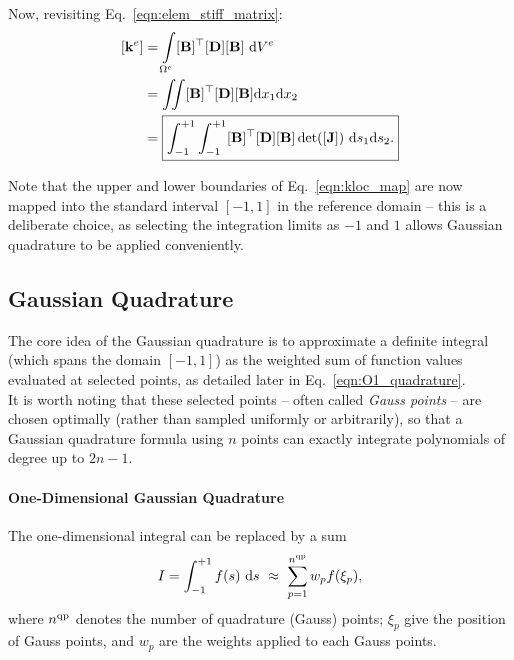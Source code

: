 \documentclass[12pt, a4paper]{article}
\numberwithin{equation}{section}
\begin{document}
Now, revisiting Eq.~\eqref{eqn:elem_stiff_matrix}:
\begin{align}
    [\mathbf{k}^e] 
    & = \int\limits_{\Omega^{e}} [\mathbf{B}]^\top [\mathbf{D}] [\mathbf{B}] \ \mathrm{d} V^e \nonumber \\
    & = \iint [\mathbf{B}]^\top [\mathbf{D}] [\mathbf{B}] \mathrm{d}x_1 \mathrm{d}x_2 \nonumber \\
    & = \boxed{\int_{-1}^{+1} \int_{-1}^{+1} [\mathbf{B}]^\top [\mathbf{D}] [\mathbf{B}] \det([\mathbf{J}]) \ \mathrm{d} s_1 \mathrm{d} s_2.} \label{eqn:kloc_map}
\end{align}

Note that the upper and lower boundaries of Eq.~\eqref{eqn:kloc_map} are now mapped into the standard interval $[-1, 1]$ in the reference domain -- this is a deliberate choice, as selecting the integration limits as $-1$ and $1$ allows Gaussian quadrature to be applied conveniently.

\newpage
\subsection{Gaussian Quadrature}
\label{section:num_quadrature}

The core idea of the Gaussian quadrature is to approximate a definite integral (which spans the domain $[-1, 1]$) as the weighted sum of function values evaluated at selected points, as detailed later in Eq.~\eqref{eqn:O1_quadrature}. \\

It is worth noting that these selected points -- often called \textit{Gauss points} -- are chosen optimally (rather than sampled uniformly or arbitrarily), so that a Gaussian quadrature formula using $n$ points can exactly integrate polynomials of degree up to $2n−1$.

\paragraph{One-Dimensional Gaussian Quadrature}
The one-dimensional integral can be replaced by a sum
\begin{equation}
\label{eqn:O1_quadrature}
    I = \int_{-1}^{+1} f(s) \ \mathrm{d}s \ \approx \ \sum_{p=1}^{n^{\rm qp}} w_p f(\xi_p),
\end{equation}
where $n^{\rm qp}$ denotes the number of quadrature (Gauss) points; $\xi_p$ give the position of Gauss points, and $w_p$ are the weights applied to each Gauss points. 
\end{document}
